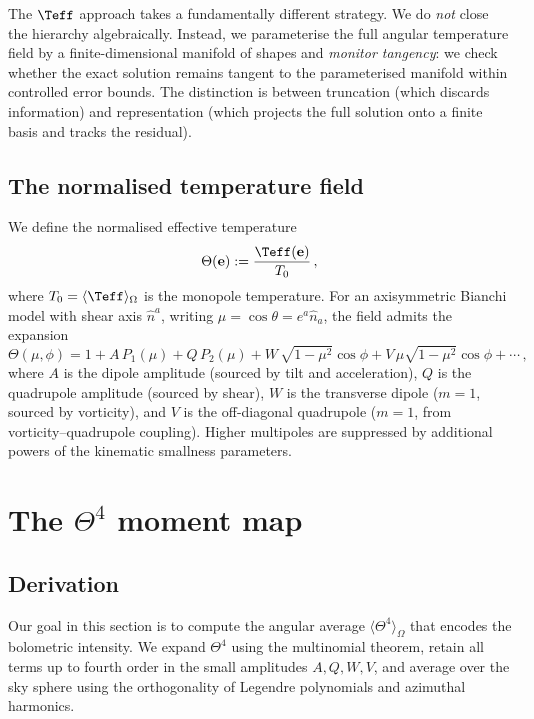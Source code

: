 The $\Teff$ approach takes a fundamentally different strategy.
We do \emph{not} close the hierarchy algebraically.  Instead,
we parameterise the full angular temperature field by a
finite-dimensional manifold of shapes and \emph{monitor
tangency}: we check whether the exact solution remains tangent
to the parameterised manifold within controlled error bounds.
The distinction is between truncation (which discards
information) and representation (which projects the full
solution onto a finite basis and tracks the residual).


\subsection{The normalised temperature field}
\label{sec:Theta-field}

We define the normalised effective temperature
\begin{equation}\label{eq:Theta-def}
\Theta(\mathbf{e}) := \frac{\Teff(\mathbf{e})}{T_0}\,,
\end{equation}
where $T_0 = \langle\Teff\rangle_\Omega$ is the monopole
temperature.  For an axisymmetric Bianchi model with shear axis
$\hat{n}^a$, writing $\mu = \cos\theta = e^a\hat{n}_a$, the
field admits the expansion
\begin{equation}\label{eq:Theta-expansion}
\Theta(\mu, \phi)
= 1 + A\,P_1(\mu) + Q\,P_2(\mu)
  + W\,\sqrt{1-\mu^2}\cos\phi
  + V\,\mu\sqrt{1-\mu^2}\cos\phi
  + \cdots\,,
\end{equation}
where $A$ is the dipole amplitude (sourced by tilt and
acceleration), $Q$ is the quadrupole amplitude (sourced by
shear), $W$ is the transverse dipole ($m = 1$, sourced by
vorticity), and $V$ is the off-diagonal quadrupole ($m = 1$,
from vorticity--quadrupole coupling).  Higher multipoles are
suppressed by additional powers of the kinematic smallness
parameters.


\section{The $\Theta^4$ moment map}\label{sec:moment-map}

\subsection{Derivation}\label{sec:F4-derivation}

Our goal in this section is to compute the angular average
$\langle\Theta^4\rangle_\Omega$ that encodes the bolometric
intensity.  We expand $\Theta^4$ using the multinomial theorem,
retain all terms up to fourth order in the small amplitudes
$A, Q, W, V$, and average over the sky sphere using the
orthogonality of Legendre polynomials and azimuthal harmonics.

